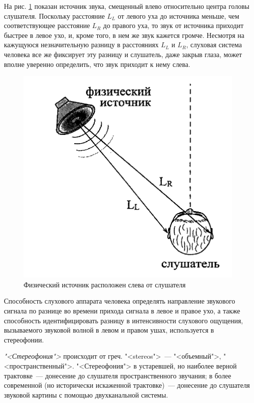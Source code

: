 \documentclass[oneside, final, 14pt]{extreport}
\begin{document}
На рис. \ref{pic-ear-14} показан источник звука, смещенный влево относительно центра
головы слушателя. Поскольку расстояние $L_L$ от левого уха до источника меньше, чем соответствующее расстояние $L_R$ до правого уха, то звук от источника приходит быстрее в левое ухо, и, кроме того, в нем же звук кажется громче. Несмотря на кажущуюся незначительную разницу в расстояниях $L_L$ и $L_R$, слуховая система человека все же фиксирует эту разницу и слушатель, даже закрыв глаза, может вполне уверенно определить, что звук приходит к нему слева.

\begin{figure}[h]
\centering
\includegraphics[scale=0.8]{pic-ear-14}
\caption{Физический источник расположен слева от слушателя}
\label{pic-ear-14}
\end{figure}

Способность слухового аппарата человека определять направление звукового сигнала по разнице во времени прихода сигнала в левое и правое ухо, а также способность идентифицировать разницу в интенсивности слухового ощущения, вызываемого звуковой волной в левом и правом ушах, используется в стереофонии.

{\itshape "<Стереофония">} происходит от греч. "<stereos">~--- "<объемный">, "<пространственный">. "<Стереофония"> в устаревшей, но наиболее верной трактовке~--- донесение до слушателя пространственного звучания; в более современной (но исторически искаженной трактовке)~--- донесение до слушателя звуковой картины с помощью двухканальной системы.
\end{document}
